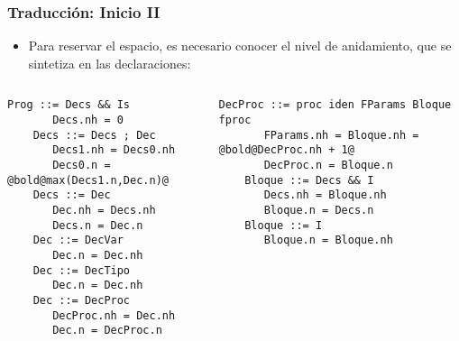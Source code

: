 \documentclass[hyperref={pdfpagelabels=false},tree-dvips,compress]{beamer}
\begin{document}
\begin{frame}[fragile]
\frametitle{Traducción: Inicio II}

\begin{itemize}
	\item Para reservar el espacio, es necesario conocer el nivel de anidamiento, que se sintetiza en las declaraciones:
\end{itemize}

\begin{columns}[T]
	\begin{lstlisting}[style=gramaticas,basicstyle=\scriptsize\ttfamily,mathescape]
	Prog ::= Decs && Is
	   Decs.nh = 0
	Decs ::= Decs ; Dec
	   Decs1.nh = Decs0.nh
	   Decs0.n = @bold@max(Decs1.n,Dec.n)@
	Decs ::= Dec
	   Dec.nh = Decs.nh
	   Decs.n = Dec.n
	Dec ::= DecVar
	   Dec.n = Dec.nh
	Dec ::= DecTipo
	   Dec.n = Dec.nh
	Dec ::= DecProc
	   DecProc.nh = Dec.nh
	   Dec.n = DecProc.n
	\end{lstlisting}

	\begin{lstlisting}[style=gramaticas,basicstyle=\scriptsize\ttfamily,mathescape]
	DecProc ::= proc iden FParams Bloque fproc
	   FParams.nh = Bloque.nh = @bold@DecProc.nh + 1@
	   DecProc.n = Bloque.n
	Bloque ::= Decs && I
	   Decs.nh = Bloque.nh
	   Bloque.n = Decs.n
	Bloque ::= I
	   Bloque.n = Bloque.nh
	\end{lstlisting}
\end{columns}

\end{frame}
\end{document}
